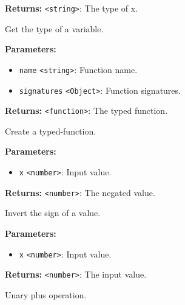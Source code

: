 \documentclass[12pt,a4paper]{article}
\begin{document}
\noindent \textbf{Returns:} \texttt{<string>}: The type of x.

\noindent Get the type of a variable.

\vspace{5mm}
\noindent {}


\noindent \textbf{Parameters:}
\begin{itemize}
  \item \texttt{name} \texttt{<string>}: Function name.
  \item \texttt{signatures} \texttt{<Object>}: Function signatures.
\end{itemize}

\noindent \textbf{Returns:} \texttt{<function>}: The typed function.

\noindent Create a typed-function.

\vspace{5mm}
\noindent {}


\noindent \textbf{Parameters:}
\begin{itemize}
  \item \texttt{x} \texttt{<number>}: Input value.
\end{itemize}

\noindent \textbf{Returns:} \texttt{<number>}: The negated value.

\noindent Invert the sign of a value.

\vspace{5mm}
\noindent {}


\noindent \textbf{Parameters:}
\begin{itemize}
  \item \texttt{x} \texttt{<number>}: Input value.
\end{itemize}

\noindent \textbf{Returns:} \texttt{<number>}: The input value.

\noindent Unary plus operation.

\vspace{5mm}
\noindent {}
\end{document}

